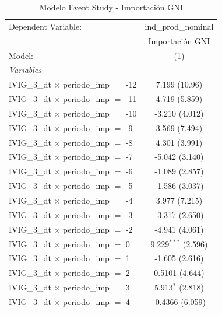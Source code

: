 \documentclass[12pt]{article}
\begin{document}
\setcounter{table}{7}
\begin{table}[htbp]
\centering
\begin{threeparttable}

   \caption{Modelo Event Study - Importación GNI}
   \centering
   \small
   \begin{tabular}{lc}
      \tabularnewline \midrule \midrule
      Dependent Variable:                           & ind\_prod\_nominal\\    
                                                    & Importación GNI \\   
      Model:                                        & (1)\\  
      \midrule
      \emph{Variables}\\
      IVIG\_3\_dt $\times$ periodo\_imp $=$ -12     & 7.199 (10.96)\\   
      IVIG\_3\_dt $\times$ periodo\_imp $=$ -11     & 4.719 (5.859)\\   
      IVIG\_3\_dt $\times$ periodo\_imp $=$ -10     & -3.210 (4.012)\\   
      IVIG\_3\_dt $\times$ periodo\_imp $=$ -9      & 3.569 (7.494)\\   
      IVIG\_3\_dt $\times$ periodo\_imp $=$ -8      & 4.301 (3.991)\\   
      IVIG\_3\_dt $\times$ periodo\_imp $=$ -7      & -5.042 (3.140)\\   
      IVIG\_3\_dt $\times$ periodo\_imp $=$ -6      & -1.089 (2.857)\\   
      IVIG\_3\_dt $\times$ periodo\_imp $=$ -5      & -1.586 (3.037)\\   
      IVIG\_3\_dt $\times$ periodo\_imp $=$ -4      & 3.977 (7.215)\\   
      IVIG\_3\_dt $\times$ periodo\_imp $=$ -3      & -3.317 (2.650)\\   
      IVIG\_3\_dt $\times$ periodo\_imp $=$ -2      & -4.941 (4.061)\\   
      IVIG\_3\_dt $\times$ periodo\_imp $=$ 0       & 9.229$^{***}$ (2.596)\\   
      IVIG\_3\_dt $\times$ periodo\_imp $=$ 1       & -1.605 (2.616)\\   
      IVIG\_3\_dt $\times$ periodo\_imp $=$ 2       & 0.5101 (4.644)\\   
      IVIG\_3\_dt $\times$ periodo\_imp $=$ 3       & 5.913$^{*}$ (2.818)\\   
      IVIG\_3\_dt $\times$ periodo\_imp $=$ 4       & -0.4366 (6.059)\\   

\end{tabular}
\end{threeparttable}
\end{table}
\end{document}
